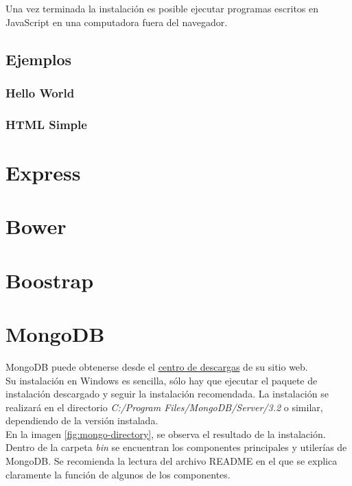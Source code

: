 \documentclass[10pt,a4paper]{report}
\begin{document}
Una vez terminada la instalación es posible ejecutar programas escritos en JavaScript en una computadora fuera del navegador.

\subsection{Ejemplos}

\subsubsection{Hello World}

\subsubsection{HTML Simple}

\section{Express}

\section{Bower}

\section{Boostrap}

\section{MongoDB}

MongoDB puede obtenerse desde el \href{https://www.mongodb.com/download-center}{centro de descargas} de su sitio web.\\

Su instalación en Windows es sencilla, sólo hay que ejecutar el paquete de instalación descargado y seguir la instalación recomendada. La instalación se realizará en el directorio \textit{C:/Program Files/MongoDB/Server/3.2} o similar, dependiendo de la versión instalada.\\

En la imagen \ref{fig:mongo-directory}, se observa el resultado de la instalación. Dentro de la carpeta \textit{bin} se encuentran los componentes principales y utilerías de MongoDB. Se recomienda la lectura del archivo README en el que se explica claramente la función de algunos de los componentes. 
\end{document}
